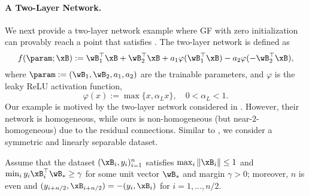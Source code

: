 \paragraph{A Two-Layer Network.}%
We next provide a two-layer network example where GF with zero initialization can provably reach a point that satisfies . The two-layer network is defined as 
\begin{equation}
\label{eq: toy-resnet}
    f(\param;\xB) := \wB_1^\top \xB + \wB_2^\top \xB + a_1 \varphi( \wB_1^\top \xB) - a_2 \varphi( - \wB_2^\top \xB),
\end{equation}
where $\param := (\wB_1, \wB_2, a_1, a_2)$ are the trainable parameters, and  $\varphi$ is the leaky ReLU activation function, 
\[
\varphi(x) := \max\{x, \alpha_L x\},\quad 0< \alpha_L<1.
\]
Our example  is motived by the two-layer network considered in \citet{lyu2021gradient}. However, their network is homogeneous, while ours is non-homogeneous (but near-$2$-homogeneous) due to the residual connections.
Similar to \citet{lyu2021gradient}, we consider a symmetric and linearly separable dataset.
\begin{assumption} 
\label{asp: symmetric}
Assume that the dataset $(\xB_i, y_i)_{i=1}^n$ satisfies $\max_{i}\|\xB_i\|\le 1$ and $\min_{i} y_i\xB_i^\top \wB_* \ge \gamma$ for some unit vector $\wB_*$ and margin $\gamma>0$; moreover, 
$n$ is even and $(y_{i+n/2},\xB_{i+n/2}) = -(y_i,\xB_i) $ for $i=1,\ldots ,n/2$. 
\end{assumption}
